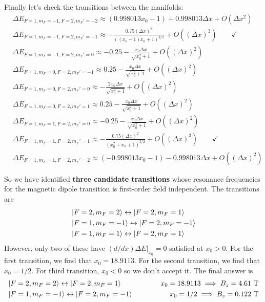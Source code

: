 \documentclass{article}
\theoremstyle{definition}
\begin{document}
\begin{enumerate}[label=(\alph*)]
	
	Finally let's check the transitions between the manifolds:
	\begin{align*}
	&\Delta E_{F=1, m_F=-1, F=2, m_F'=-2} \approx  (0.998013 x_0-1)+0.998013 \Delta x+O\left(\Delta x^2\right)\\
	&\Delta E_{F=1, m_F=-1, F=2, m_F'=-1} \approx -\frac{0.75 (\Delta x)^2}{((x_0-1) x_0+1)^{3/2}}+O\left((\Delta x)^3\right) \quad\quad \checkmark \\
	&\Delta E_{F=1, m_F=-1, F=2, m_F'=0} \approx -0.25-\frac{x_0\Delta x }{\sqrt{x_0^2+1}}+O\left((\Delta x)^2\right)\\
	&\Delta E_{F=1, m_F=0, F=2, m_F'=-1} \approx 0.25-\frac{x_0 \Delta x }{\sqrt{x_0^2+1}}+O\left((\Delta x)^2\right)\\
	&\Delta E_{F=1, m_F=0, F=2, m_F'=0} \approx -\frac{2 x_0 \Delta x }{\sqrt{x_0^2+1}}+O\left((\Delta x)^2\right)\\
	&\Delta E_{F=1, m_F=0, F=2, m_F'=1} \approx 0.25-\frac{x_0\Delta x }{\sqrt{x_0^2+1}}+O\left((\Delta x)^2\right)\\
	&\Delta E_{F=1, m_F=1, F=2, m_F'=0} \approx -0.25-\frac{x_0 \Delta x }{\sqrt{x_0^2+1}}+O\left((\Delta x)^2\right)\\
	&\Delta E_{F=1, m_F=1, F=2, m_F'=1} \approx -\frac{0.75 (\Delta x)^2}{\left(x_0^2+x_0+1\right)^{3/2}}+O\left((\Delta x)^3\right)\quad\quad \checkmark \\
	&\Delta E_{F=1, m_F=1, F=2, m_F'=2} \approx (-0.998013 x_0-1)-0.998013 \Delta x+O\left((\Delta x)^2\right)
	\end{align*}
	
	So we have identified \textbf{three candidate transitions} whose resonance frequencies for the magnetic dipole transition is first-order field independent. The transitions are
	\begin{align*}
	&\ket{F=2, m_F = 2} \leftrightarrow \ket{F=2, m_F=1}\\
	&\ket{F=1, m_F = -1} \leftrightarrow \ket{F=2, m_F=-1}\\
	&\ket{F=1, m_F = 1} \leftrightarrow \ket{F=2, m_F=1}
	\end{align*}
	However, only two of these have $(d/dx)\Delta E\vert_{x_0} = 0$ satisfied at $x_0 > 0$. For the first transition, we find that $\boxed{x_0 = 18.9113}$. For the second transition, we find that $\boxed{x_0 = 1/2}$. For third transition, $x_0<0$ so we don't accept it. The final answer is 
	\begin{align*}
	&\ket{F=2, m_F = 2} \leftrightarrow \ket{F=2, m_F=1}\quad\quad\quad &x_0 = 18.9113 \implies B_z = 4.61 \text{ T} \\
	&\ket{F=1, m_F = -1} \leftrightarrow \ket{F=2, m_F=-1}\quad\quad\quad &x_0 = 1/2 \implies B_z = 0.122 \text{ T}\\
	\end{align*}
	

\end{enumerate}
\end{document}
